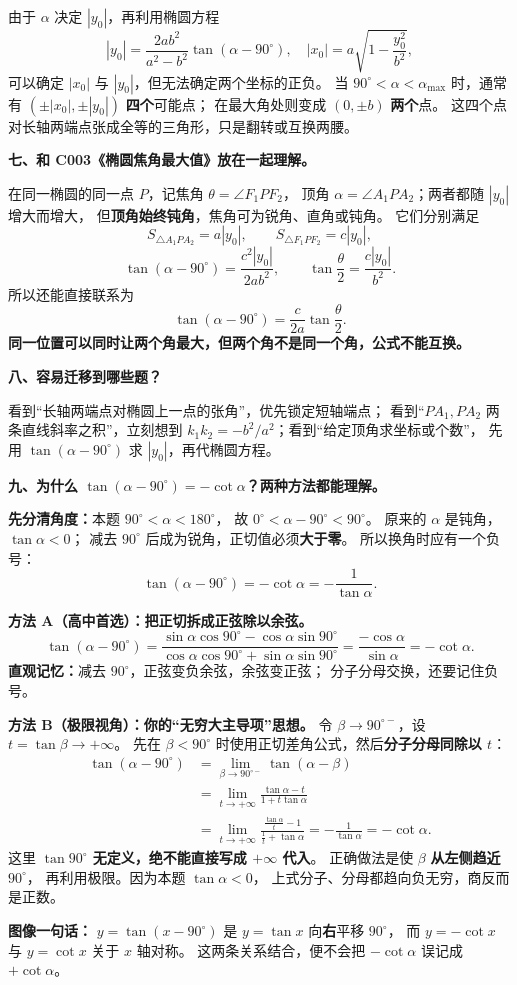 \begin{explanationbox}
由于 $\alpha$ 决定 $|y_0|$，再利用椭圆方程
\[
|y_0|=\frac{2ab^2}{a^2-b^2}\tan(\alpha-90^\circ),
\quad |x_0|=a\sqrt{1-\frac{y_0^2}{b^2}},
\]
可以确定 $|x_0|$ 与 $|y_0|$，但无法确定两个坐标的正负。
当 $90^\circ<\alpha<\alpha_{\max}$ 时，通常有
$(\pm|x_0|,\pm|y_0|)$ \textbf{四个}可能点；
在最大角处则变成 $(0,\pm b)$ \textbf{两个}点。
这四个点对长轴两端点张成全等的三角形，只是翻转或互换两腰。

\medskip
\textbf{七、和 C003《椭圆焦角最大值》放在一起理解。}

在同一椭圆的同一点 $P$，记焦角 $\theta=\angle F_1PF_2$，
顶角 $\alpha=\angle A_1PA_2$；两者都随 $|y_0|$ 增大而增大，
但\textbf{顶角始终钝角}，焦角可为锐角、直角或钝角。
它们分别满足
\[
S_{\triangle A_1PA_2}=a|y_0|,\qquad
S_{\triangle F_1PF_2}=c|y_0|,
\]
\[
\tan(\alpha-90^\circ)=\frac{c^2|y_0|}{2ab^2},\qquad
\tan\frac\theta2=\frac{c|y_0|}{b^2}.
\]
所以还能直接联系为
\[
\boxed{\tan(\alpha-90^\circ)=\frac{c}{2a}\tan\frac\theta2}.
\]
\textbf{同一位置可以同时让两个角最大，但两个角不是同一个角，公式不能互换。}

\medskip
\textbf{八、容易迁移到哪些题？}

看到“长轴两端点对椭圆上一点的张角”，优先锁定短轴端点；
看到“$PA_1,PA_2$ 两条直线斜率之积”，立刻想到
$k_1k_2=-b^2/a^2$；看到“给定顶角求坐标或个数”，
先用 $\tan(\alpha-90^\circ)$ 求 $|y_0|$，再代椭圆方程。

\medskip
\textbf{九、为什么 $\tan(\alpha-90^\circ)=-\cot\alpha$？两种方法都能理解。}

\textbf{先分清角度：}本题 $90^\circ<\alpha<180^\circ$，
故 $0^\circ<\alpha-90^\circ<90^\circ$。
原来的 $\alpha$ 是钝角，$\tan\alpha<0$；
减去 $90^\circ$ 后成为锐角，正切值必须\textbf{大于零}。
所以换角时应有一个负号：
\[
\boxed{\tan(\alpha-90^\circ)=-\cot\alpha=-\frac{1}{\tan\alpha}}.
\]

\textbf{方法 A（高中首选）：把正切拆成正弦除以余弦。}
\[
\tan(\alpha-90^\circ)
=\frac{\sin\alpha\cos90^\circ-\cos\alpha\sin90^\circ}
       {\cos\alpha\cos90^\circ+\sin\alpha\sin90^\circ}
=\frac{-\cos\alpha}{\sin\alpha}
=-\cot\alpha.
\]
\textbf{直观记忆：}减去 $90^\circ$，正弦变负余弦，余弦变正弦；
分子分母交换，还要记住负号。

\textbf{方法 B（极限视角）：你的“无穷大主导项”思想。}
令 $\beta\to90^{\circ-}$，设 $t=\tan\beta\to+\infty$。
先在 $\beta<90^\circ$ 时使用正切差角公式，然后\textbf{分子分母同除以 $t$}：
\[
\begin{aligned}
\tan(\alpha-90^\circ)
&=\lim_{\beta\to90^{\circ-}}\tan(\alpha-\beta)\\
&=\lim_{t\to+\infty}\frac{\tan\alpha-t}{1+t\tan\alpha}\\
&=\lim_{t\to+\infty}
\frac{\frac{\tan\alpha}{t}-1}{\frac1t+\tan\alpha}
=-\frac1{\tan\alpha}=-\cot\alpha.
\end{aligned}
\]
这里 \textbf{$\tan90^\circ$ 无定义，绝不能直接写成 $+\infty$ 代入}。
正确做法是使 $\beta$ \textbf{从左侧趋近} $90^\circ$，
再利用极限。因为本题 $\tan\alpha<0$，
上式分子、分母都趋向负无穷，商反而是正数。

\textbf{图像一句话：}
$y=\tan(x-90^\circ)$ 是 $y=\tan x$ 向\textbf{右}平移 $90^\circ$，
而 $y=-\cot x$ 与 $y=\cot x$ 关于 $x$ 轴对称。
这两条关系结合，便不会把 $-\cot\alpha$ 误记成 $+\cot\alpha$。
\end{explanationbox}
